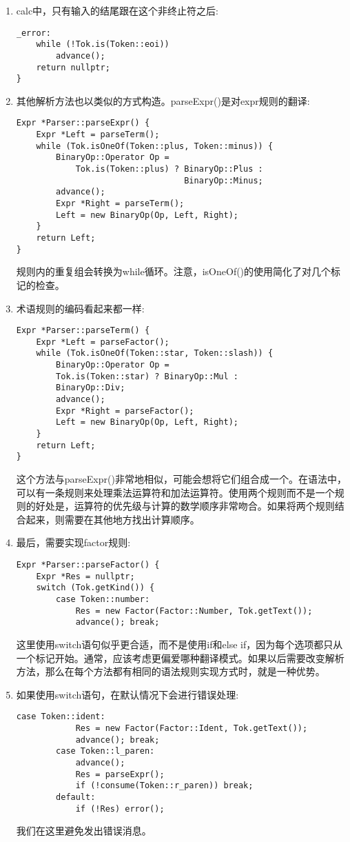 \begin{enumerate}
\item calc中，只有输入的结尾跟在这个非终止符之后:
\begin{lstlisting}[caption={}]
_error:
	while (!Tok.is(Token::eoi))
		advance();
	return nullptr;
}
\end{lstlisting}

\item 其他解析方法也以类似的方式构造。parseExpr()是对expr规则的翻译:
\begin{lstlisting}[caption={}]
Expr *Parser::parseExpr() {
	Expr *Left = parseTerm();
	while (Tok.isOneOf(Token::plus, Token::minus)) {
		BinaryOp::Operator Op =
			Tok.is(Token::plus) ? BinaryOp::Plus :
								  BinaryOp::Minus;
		advance();
		Expr *Right = parseTerm();
		Left = new BinaryOp(Op, Left, Right);
	}
	return Left;
}
\end{lstlisting}
规则内的重复组会转换为while循环。注意，isOneOf()的使用简化了对几个标记的检查。

\item 术语规则的编码看起来都一样:
\begin{lstlisting}[caption={}]
Expr *Parser::parseTerm() {
	Expr *Left = parseFactor();
	while (Tok.isOneOf(Token::star, Token::slash)) {
		BinaryOp::Operator Op =
		Tok.is(Token::star) ? BinaryOp::Mul :
		BinaryOp::Div;
		advance();
		Expr *Right = parseFactor();
		Left = new BinaryOp(Op, Left, Right);
	}
	return Left;
}
\end{lstlisting}
这个方法与parseExpr()非常地相似，可能会想将它们组合成一个。在语法中，可以有一条规则来处理乘法运算符和加法运算符。使用两个规则而不是一个规则的好处是，运算符的优先级与计算的数学顺序非常吻合。如果将两个规则结合起来，则需要在其他地方找出计算顺序。

\item 最后，需要实现factor规则:
\begin{lstlisting}[caption={}]
Expr *Parser::parseFactor() {
	Expr *Res = nullptr;
	switch (Tok.getKind()) {
		case Token::number:
			Res = new Factor(Factor::Number, Tok.getText());
			advance(); break;
\end{lstlisting}
这里使用switch语句似乎更合适，而不是使用if和else if，因为每个选项都只从一个标记开始。通常，应该考虑更偏爱哪种翻译模式。如果以后需要改变解析方法，那么在每个方法都有相同的语法规则实现方式时，就是一种优势。

\item 如果使用switch语句，在默认情况下会进行错误处理:
\begin{lstlisting}[caption={}]
		case Token::ident:
			Res = new Factor(Factor::Ident, Tok.getText());
			advance(); break;
		case Token::l_paren:
			advance();
			Res = parseExpr();
			if (!consume(Token::r_paren)) break;
		default:
			if (!Res) error();
\end{lstlisting}
我们在这里避免发出错误消息。


\end{enumerate}
